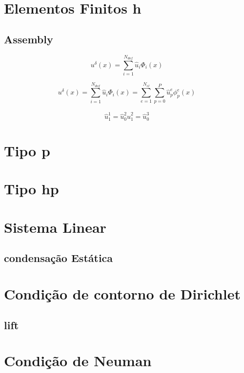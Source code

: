 \section{Elementos Finitos h} 
\subsection{Assembly}
\begin{equation}
u^{\delta}(x) = \sum^{N_{dof}}_{i = 1} \hat{u}_i \Phi_i(x) 
\end{equation}

\begin{equation}
 u^{\delta}(x) = \sum^{N_{dof}}_{i = 1} \hat{u}_i \Phi_i(x) = \sum^{N_{el}}_{e=1} \sum^{P}_{p=0}  \hat{u}^{e}_p \phi^{e}_p(x)
\end{equation}

\begin{align}
\hat{u}^{1}_{1} = \hat{u}^{2}_{0}
\hat{u}^{2}_{1} = \hat{u}^{3}_{0}
\end{align}

\section{Tipo p}
\section{Tipo hp}
\section{Sistema Linear}
\subsection{condensação Estática}
\section{Condição de contorno de Dirichlet}
\subsection{lift}
\section{Condição de Neuman}